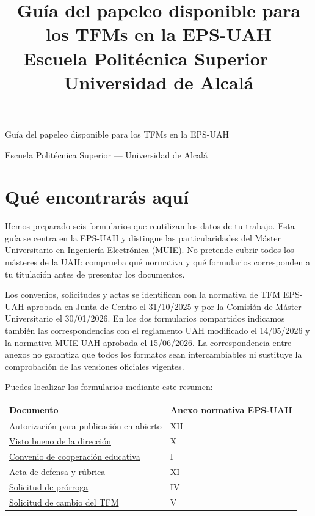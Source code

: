 \documentclass[10pt,a4paper]{article}
\title{Guía del papeleo disponible para los TFMs en la EPS-UAH\\\large Escuela Politécnica Superior --- Universidad de Alcalá}
\author{}
\date{}
\begin{document}
\begin{center}
{\LARGE Guía del papeleo disponible para los TFMs en la EPS-UAH\par}
\medskip
{\large Escuela Politécnica Superior --- Universidad de Alcalá\par}
\end{center}

{\small
\setlength{\parskip}{0pt}
\tableofcontents
}
\medskip

\section{Qué encontrarás aquí}

Hemos preparado seis formularios que reutilizan los datos de tu trabajo. Esta guía se centra en la EPS-UAH y distingue las particularidades del Máster Universitario en Ingeniería Electrónica (MUIE). No pretende cubrir todos los másteres de la UAH: comprueba qué normativa y qué formularios corresponden a tu titulación antes de presentar los documentos.

Los convenios, solicitudes y actas se identifican con la normativa de TFM EPS-UAH aprobada en Junta de Centro el 31/10/2025 y por la Comisión de Máster Universitario el 30/01/2026. En los dos formularios compartidos indicamos también las correspondencias con el reglamento UAH modificado el 14/05/2026 y la normativa MUIE-UAH aprobada el 15/06/2026. La correspondencia entre anexos no garantiza que todos los formatos sean intercambiables ni sustituye la comprobación de las versiones oficiales vigentes.

Puedes localizar los formularios mediante este resumen:

\medskip
\begin{tabularx}{\textwidth}{@{}Xl@{}}
\toprule
Documento & Anexo normativa EPS-UAH \\
\midrule
\hyperref[form:publicacion]{Autorización para publicación en abierto} & XII \\
\hyperref[form:visto-bueno]{Visto bueno de la dirección} & X \\
\hyperref[form:convenio]{Convenio de cooperación educativa} & I \\
\hyperref[form:acta]{Acta de defensa y rúbrica} & XI \\
\hyperref[form:prorroga]{Solicitud de prórroga} & IV \\
\hyperref[form:cambio]{Solicitud de cambio del TFM} & V \\
\bottomrule
\end{tabularx}
\end{document}
